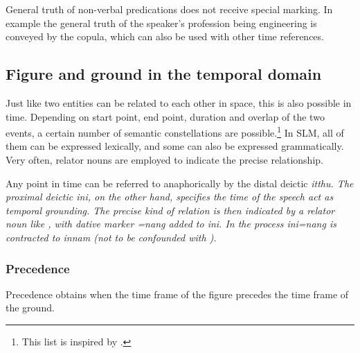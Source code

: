 General truth of non-verbal predications does not receive special marking. In example  the general truth of the speaker's profession being engineering is conveyed by the copula, which can also be used with other time references.



\subsection{Figure and ground in the temporal domain}\label{sec:func:Figureandgroundinthetemporaldomain}
Just like two entities can be related to each other in space, this is also possible in time. Depending on start point, end point, duration and overlap of the two events, a certain number of semantic constellations are possible.\footnote{This list is inspired by \citet[330]{Givon2001b}.}  In SLM, all of them can be expressed lexically, and some can also be expressed grammatically. Very often, relator nouns are employed to indicate the precise relationship.

Any point in time can be referred to anaphorically by the distal deictic \em itthu\em. The proximal deictic \em ini, \em  on the other hand, specifies the time of the speech act as temporal grounding. The precise kind of relation is then indicated by a relator noun like , with  dative marker \em =nang \em added to \em ini\em. In the process \em ini=nang \em is contracted to \em innam \em (not to be confounded with ).




\subsubsection{Precedence}\label{sec:func:Precedence}
Precedence obtains when the time frame of the figure precedes the time frame of the ground.


